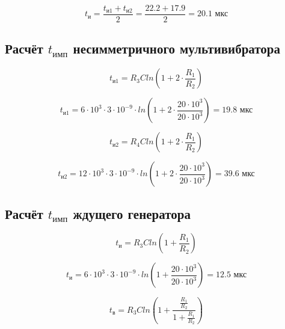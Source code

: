 \begin{displaymath}
	t_{\text{и}} = \frac{t_{\text{и1}} + t_{\text{и2}}}{2} = \frac{22.2 + 17.9}{2} = 20.1 \text{ мкс}
\end{displaymath}

\subsection{Расчёт $t_\text{имп}$ несимметричного мультивибратора}

\begin{equation}
	\label{eq:4:3}
	t_{\text{и1}} = R_3 C ln\left(1 + 2 \cdot \frac{R_1}{R_2}\right) 
\end{equation}

\begin{displaymath}
	t_{\text{и1}} = 6 \cdot 10^3 \cdot 3 \cdot 10^{-9} \cdot ln\left(1 + 2 \cdot \frac{20 \cdot 10^3}{20 \cdot 10^3} \right) = 19.8 \text{ мкс}
\end{displaymath}

\begin{equation}
	\label{eq:4:4}
	t_{\text{и2}} = R_4 C ln\left(1 + 2 \cdot \frac{R_1}{R_2}\right) 
\end{equation}

\begin{displaymath}
	t_{\text{и2}} = 12 \cdot 10^3 \cdot 3 \cdot 10^{-9} \cdot ln\left(1 + 2 \cdot \frac{20 \cdot 10^3}{20 \cdot 10^3} \right) = 39.6 \text{ мкс}
\end{displaymath}

\subsection{Расчёт $t_\text{имп}$ ждущего генератора}

\begin{equation}
	\label{eq:4:5}
	t_{\text{и}} = R_3 C ln\left(1 + \frac{R_1}{R_2}\right) 
\end{equation}

\begin{displaymath}
	t_{\text{и}} = 6 \cdot 10^3 \cdot 3 \cdot 10^{-9} \cdot ln\left(1 + \frac{20 \cdot 10^3}{20 \cdot 10^3}\right) = 12.5 \text{ мкс} 
\end{displaymath}

\begin{equation}
	\label{eq:4:6}
	t_{\text{в}} = R_3 C ln\left(1 + \frac{\frac{R_1}{R_2}}{1 + \frac{R_1}{R_2}}\right)
\end{equation}

